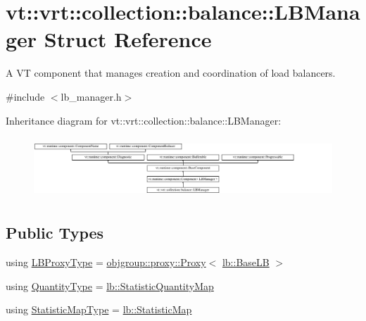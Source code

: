 \hypertarget{structvt_1_1vrt_1_1collection_1_1balance_1_1_l_b_manager}{}\section{vt\+:\+:vrt\+:\+:collection\+:\+:balance\+:\+:L\+B\+Manager Struct Reference}
\label{structvt_1_1vrt_1_1collection_1_1balance_1_1_l_b_manager}


A VT component that manages creation and coordination of load balancers.  




{\ttfamily \#include $<$lb\+\_\+manager.\+h$>$}

Inheritance diagram for vt\+:\+:vrt\+:\+:collection\+:\+:balance\+:\+:L\+B\+Manager\+:\begin{figure}[H]
\begin{center}
\leavevmode
\includegraphics[height=2.310231cm]{structvt_1_1vrt_1_1collection_1_1balance_1_1_l_b_manager}
\end{center}
\end{figure}
\subsection*{Public Types}
\begin{DoxyCompactItemize}
\item 
using \hyperlink{structvt_1_1vrt_1_1collection_1_1balance_1_1_l_b_manager_a8b1a7735366beb85c2c2ccc3912cdd80}{L\+B\+Proxy\+Type} = \hyperlink{structvt_1_1objgroup_1_1proxy_1_1_proxy}{objgroup\+::proxy\+::\+Proxy}$<$ \hyperlink{structvt_1_1vrt_1_1collection_1_1lb_1_1_base_l_b}{lb\+::\+Base\+LB} $>$
\item 
using \hyperlink{structvt_1_1vrt_1_1collection_1_1balance_1_1_l_b_manager_ab76adf3f0da19ba30d9f95bb882bda65}{Quantity\+Type} = \hyperlink{namespacevt_1_1vrt_1_1collection_1_1lb_aa3a389ff9262dd6be27791dcf037ef38}{lb\+::\+Statistic\+Quantity\+Map}
\item 
using \hyperlink{structvt_1_1vrt_1_1collection_1_1balance_1_1_l_b_manager_a3c6941b9c14a77e015047c659b817a85}{Statistic\+Map\+Type} = \hyperlink{namespacevt_1_1vrt_1_1collection_1_1lb_a497ad83ef5825f2ea18ed20a228870d3}{lb\+::\+Statistic\+Map}
\end{DoxyCompactItemize}
